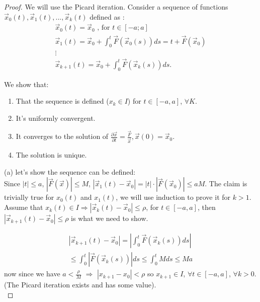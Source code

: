 \begin{proof}
    We will use the Picard iteration. Consider a sequence of functions $\vec{x}_0 (t), \vec{x}_1 (t), ...,\vec{x}_k (t)$ defined as :
    \begin{align*}
        \vec{x}_0(t)  = \vec{x}_0 \text{ , for $t \in [-a;a]$} \\
        \vec{x}_1(t)  = \vec{x}_0 + \int_0^t \vec{F}(\vec{x}_0(s)) ds = t + \vec{F}(\vec{x}_0)\\
        \vdots \\
        \vec{x}_{k+1}(t)  = \vec{x}_0 + \int_0^t \vec{F}(\vec{x}_k(s)) ds.
    \end{align*}

    We show that:
    \begin{enumerate}[label=(\alph*)]
        \item That the sequence is defined ($x_k \in I$) for $t \in [-a,a]$, $\forall K$. 
        \item It's uniformly convergent. 
        \item It converges to the solution of $\frac{\partial \vec{x}}{\partial t} = \frac{\vec{F}}{\vec{x}}, \vec{x}(0) = \vec{x}_0$.
        \item The solution is unique.
    \end{enumerate}

    \noindent (a) let's show the sequence can be defined: \\

    Since $|t| \leq a$, $|\vec{F}(\vec{x})| \leq M$, $|\vec{x}_1(t) - \vec{x}_0| = |t| \cdot |\vec{F}(\vec{x}_0)| \leq a M$. The claim is trivially true for $x_0(t)$ and $x_1(t)$, we will use induction to prove it for $k>1$. \\

    Assume that $x_k(t) \in I \Rightarrow |\vec{x}_k(t) - \vec{x}_0| \leq \rho$, for $t \in [-a,a]$, then $|\vec{x}_{k+1}(t) - \vec{x}_0| \leq \rho$ is what we need to show.

    \begin{align*}
        |\vec{x}_{k+1}(t) - \vec{x}_0| = |\int^t_0 \vec{F}(\vec{x}_k(s)) ds| \\
        \leq \int^t_0 |\vec{F}(\vec{x}_k(s))| ds \leq  \int^t_0 M ds \leq  M a
    \end{align*}
    now since we have $a < \frac{\rho}{M}$ $\Rightarrow$ $|x_{k+1} - x_0| < \rho$ so $x_{k+1} \in I$, $\forall t \in [-a,a]$, $\forall k > 0$. (The Picard iteration exists and has some value). \\


\end{proof}
